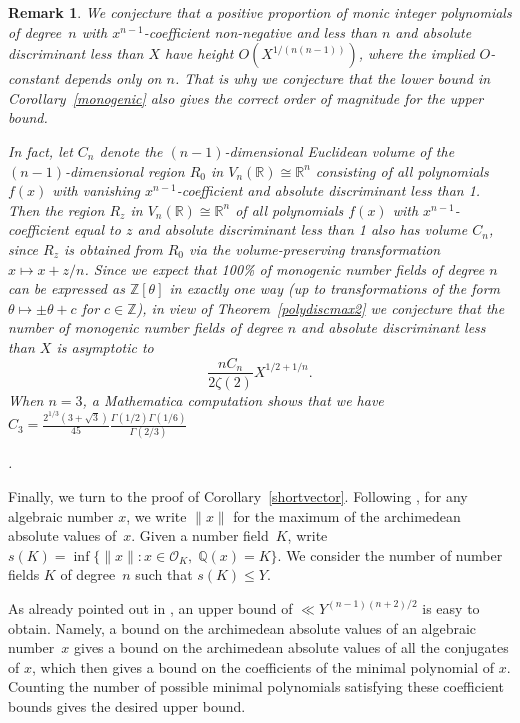 \documentclass[11pt]{article}
\def\Z{{\mathbb Z}}
\def\OO{{\mathcal O}}
\def\R{{\mathbb R}}
\def\Q{{\mathbb Q}}
\def\Vmn{{V_n}}
\def\Z{{\mathbb Z}}
\def\Q{{\mathbb Q}}
\newtheorem{remark}[theorem]{Remark}
\begin{document}
\begin{remark}{\em
We conjecture that a positive proportion of monic integer polynomials
of degree~$n$ with $x^{n-1}$-coefficient non-negative and less than
$n$ and absolute discriminant less than $X$ have height $O(
X^{1/(n(n-1))})$, where the implied $O$-constant depends only on $n$.
That is why we conjecture that the lower bound in
Corollary~\ref{monogenic} also gives the correct order of magnitude
for the upper bound.

In fact, let $C_n$ denote the $(n-1)$-dimensional Euclidean volume of
the $(n-1)$-dimensional region $R_0$ in $\Vmn(\R)\cong\R^n$
consisting of all polynomials $f(x)$ with vanishing
$x^{n-1}$-coefficient and absolute discriminant less than 1.  Then the
region $R_z$ in $\Vmn(\R)\cong\R^n$ of all polynomials $f(x)$ with
$x^{n-1}$-coefficient equal to $z$ and absolute discriminant less than
1 also has volume $C_n$, since $R_z$ is obtained from $R_0$ via the
volume-preserving transformation $x\mapsto x+z/n$.  Since we expect
that 100\% of monogenic number fields of degree $n$ can be expressed
as $\Z[\theta]$ in exactly one way (up to transformations of the form
$\theta\mapsto \pm \theta + c$ for $c\in \Z$), in view of
Theorem~\ref{polydiscmax2} we conjecture that the number of monogenic
number fields of degree $n$ and absolute discriminant less than $X$ is
asymptotic to
\begin{equation}
\frac{nC_n}{2\zeta(2)} X^{1/2+1/n}.
\end{equation}
When $n=3$, a Mathematica computation shows that we have
$C_3= \frac{2^{1/3}(3+\sqrt{3})}{45} \frac{\Gamma(1/2)\Gamma(1/6)}{\Gamma(2/3)}$}.
\end{remark}

Finally, we turn to the proof of
Corollary~\ref{shortvector}. Following \cite{EV}, for any algebraic
number $x$, we write $\|x\|$ for the maximum of the archimedean
absolute values of~$x$. Given a number field~$K$, write
$s(K)=\inf\{\|x\|: x\in\OO_K,\; \Q(x)=K\}$. We consider the number of
number fields $K$ of degree~$n$ such that $s(K)\leq Y$.

As already pointed out in \cite[Remark~3.3]{EV}, an upper bound of $\ll
Y^{(n-1)(n+2)/2}$ is easy to obtain.  Namely, a bound on the
archimedean absolute values of an algebraic number~$x$ gives a bound
on the archimedean absolute values of all the conjugates of $x$, which
then gives a bound on the coefficients of the minimal polynomial of
$x$. Counting the number of possible minimal polynomials satisfying
these coefficient bounds gives the desired upper bound.
\end{document}
